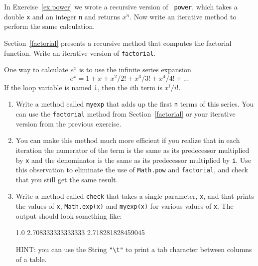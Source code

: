 \begin{exercise}
In Exercise~\ref{ex.power} we wrote a recursive version of {\tt
power}, which takes a double {\tt x} and an integer {\tt n} and
returns $x^n$.  Now write an iterative method to perform the same
calculation.
\end{exercise}

\begin{exercise}
Section~\ref{factorial} presents a recursive method
that computes the factorial function.
Write an iterative version of {\tt factorial}.
\end{exercise}

\begin{exercise}
One way to calculate $e^x$ is to use the infinite series expansion
%
\begin{equation*}
e^x = 1 + x + x^2 / 2! + x^3 / 3! + x^4 / 4! + ...
\end{equation*}
%
If the loop variable is named {\tt i}, then the $i$th term is
$x^i / i!$.

\begin{enumerate}

\item Write a method called {\tt myexp} that adds up the first {\tt n}
terms of this series.  You can use the {\tt factorial}
method from Section~\ref{factorial} or your iterative version from the
previous exercise.

\item You can make this method much more efficient if you realize that
in each iteration the numerator of the term is the same as its
predecessor multiplied by {\tt x} and the denominator is the same as
its predecessor multiplied by {\tt i}.  Use this observation to
eliminate the use of {\tt Math.pow} and {\tt factorial}, and check
that you still get the same result.

\item Write a method called {\tt check} that takes a single parameter,
{\tt x}, and that prints the values of {\tt x}, {\tt Math.exp(x)} and
{\tt myexp(x)} for various values of {\tt x}.  The output should look
something like:

\begin{stdout}
1.0     2.708333333333333       2.718281828459045
\end{stdout}

HINT: you can use the String {\tt "\textbackslash t"} to print a tab character
between columns of a table.


\end{enumerate}
\end{exercise}
